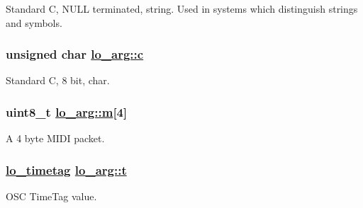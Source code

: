 Standard C, NULL terminated, string. Used in systems which distinguish strings and symbols. \hypertarget{unionlo__arg_a2e1c99864cf46e6b9cc52fb5cb214fe}{
\subsubsection[c]{\setlength{\rightskip}{0pt plus 5cm}unsigned char \hyperlink{unionlo__arg_a2e1c99864cf46e6b9cc52fb5cb214fe}{lo\_\-arg::c}}}
\label{unionlo__arg_a2e1c99864cf46e6b9cc52fb5cb214fe}


Standard C, 8 bit, char. \hypertarget{unionlo__arg_96d32df951c54eaff5dc67fc97a70c83}{
\subsubsection[m]{\setlength{\rightskip}{0pt plus 5cm}uint8\_\-t \hyperlink{unionlo__arg_96d32df951c54eaff5dc67fc97a70c83}{lo\_\-arg::m}\mbox{[}4\mbox{]}}}
\label{unionlo__arg_96d32df951c54eaff5dc67fc97a70c83}


A 4 byte MIDI packet. \hypertarget{unionlo__arg_fc89e5569fba7a660638839366b17408}{
\subsubsection[t]{\setlength{\rightskip}{0pt plus 5cm}\hyperlink{structlo__timetag}{lo\_\-timetag} \hyperlink{unionlo__arg_fc89e5569fba7a660638839366b17408}{lo\_\-arg::t}}}
\label{unionlo__arg_fc89e5569fba7a660638839366b17408}


OSC Time\-Tag value. 